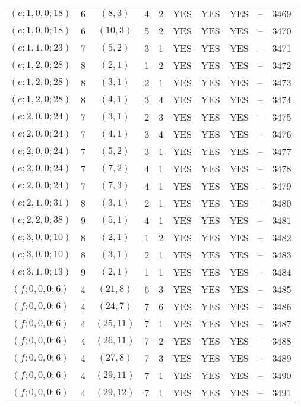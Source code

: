 \begin{longtable}{|c|c|c|c|c|c|c|c|c|c|}
$(e; 1, 0, 0; 18)$ & 6 & $(8, 3)$ & 4 & 2 & YES & YES & YES & -- & 3469\\
$(e; 1, 0, 0; 18)$ & 6 & $(10, 3)$ & 5 & 2 & YES & YES & YES & -- & 3470\\
$(e; 1, 1, 0; 23)$ & 7 & $(5, 2)$ & 3 & 1 & YES & YES & YES & -- & 3471\\
$(e; 1, 2, 0; 28)$ & 8 & $(2, 1)$ & 1 & 2 & YES & YES & YES & -- & 3472\\
$(e; 1, 2, 0; 28)$ & 8 & $(3, 1)$ & 2 & 1 & YES & YES & YES & -- & 3473\\
$(e; 1, 2, 0; 28)$ & 8 & $(4, 1)$ & 3 & 4 & YES & YES & YES & -- & 3474\\
$(e; 2, 0, 0; 24)$ & 7 & $(3, 1)$ & 2 & 3 & YES & YES & YES & -- & 3475\\
$(e; 2, 0, 0; 24)$ & 7 & $(4, 1)$ & 3 & 4 & YES & YES & YES & -- & 3476\\
$(e; 2, 0, 0; 24)$ & 7 & $(5, 2)$ & 3 & 1 & YES & YES & YES & -- & 3477\\
$(e; 2, 0, 0; 24)$ & 7 & $(7, 2)$ & 4 & 1 & YES & YES & YES & -- & 3478\\
$(e; 2, 0, 0; 24)$ & 7 & $(7, 3)$ & 4 & 1 & YES & YES & YES & -- & 3479\\
$(e; 2, 1, 0; 31)$ & 8 & $(3, 1)$ & 2 & 1 & YES & YES & YES & -- & 3480\\
$(e; 2, 2, 0; 38)$ & 9 & $(5, 1)$ & 4 & 1 & YES & YES & YES & -- & 3481\\
$(e; 3, 0, 0; 10)$ & 8 & $(2, 1)$ & 1 & 2 & YES & YES & YES & -- & 3482\\
$(e; 3, 0, 0; 10)$ & 8 & $(3, 1)$ & 2 & 1 & YES & YES & YES & -- & 3483\\
$(e; 3, 1, 0; 13)$ & 9 & $(2, 1)$ & 1 & 1 & YES & YES & YES & -- & 3484\\
$(f; 0, 0, 0; 6)$ & 4 & $(21, 8)$ & 6 & 3 & YES & YES & YES & -- & 3485\\
$(f; 0, 0, 0; 6)$ & 4 & $(24, 7)$ & 7 & 6 & YES & YES & YES & -- & 3486\\
$(f; 0, 0, 0; 6)$ & 4 & $(25, 11)$ & 7 & 1 & YES & YES & YES & -- & 3487\\
$(f; 0, 0, 0; 6)$ & 4 & $(26, 11)$ & 7 & 2 & YES & YES & YES & -- & 3488\\
$(f; 0, 0, 0; 6)$ & 4 & $(27, 8)$ & 7 & 3 & YES & YES & YES & -- & 3489\\
$(f; 0, 0, 0; 6)$ & 4 & $(29, 11)$ & 7 & 1 & YES & YES & YES & -- & 3490\\
$(f; 0, 0, 0; 6)$ & 4 & $(29, 12)$ & 7 & 1 & YES & YES & YES & -- & 3491\\

\end{longtable}
